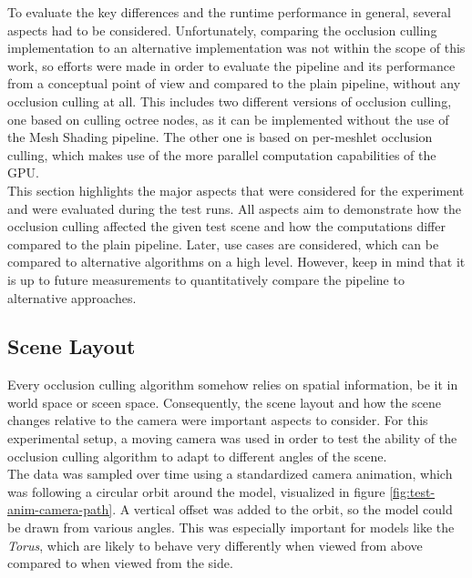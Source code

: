 To evaluate the key differences and the runtime performance in general, several aspects had to be considered.
Unfortunately, comparing the occlusion culling implementation to an alternative implementation was not within the 
scope of this work, so efforts were made in order to evaluate the pipeline and its performance from a conceptual 
point of view and compared to the plain pipeline, without any occlusion culling at all. This includes two different 
versions of occlusion culling, one based on culling octree nodes, as it can be implemented without the use of the 
Mesh Shading pipeline. The other one is based on per-meshlet occlusion culling, which makes use of the more parallel 
computation capabilities of the \ac{GPU}. \\

This section highlights the major aspects that were considered for the experiment and were evaluated during the 
test runs. All aspects aim to demonstrate how the occlusion culling affected the given test scene and how the 
computations differ compared to the plain pipeline. Later, use cases are considered, which can be compared to 
alternative algorithms on a high level. However, keep in mind that it is up to future measurements to quantitatively 
compare the pipeline to alternative approaches. 


\subsection*{Scene Layout} \label{subsec-scene-layout}

Every occlusion culling algorithm somehow relies on spatial information, be it in world space or sceen space. 
Consequently, the scene layout and how the scene changes relative to the camera were important aspects to consider. 
For this experimental setup, a moving camera was used in order to test the ability of the occlusion culling 
algorithm to adapt to different angles of the scene. \\

\noindent
The data was sampled over time using a standardized camera animation, which was following a circular orbit 
around the model, visualized in figure \ref{fig:test-anim-camera-path}. A vertical offset was added to the orbit, 
so the model could be drawn from various angles. This was especially important for models like the \emph{Torus}, 
which are likely to behave very differently when viewed from above compared to when viewed from the side.

